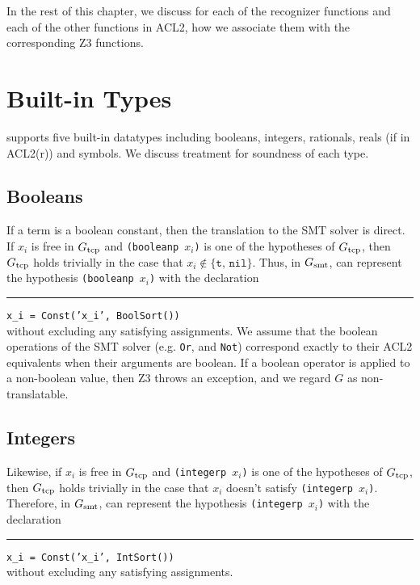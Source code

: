 In the rest of this chapter, we discuss for each of the recognizer functions and
each of the other functions in ACL2, how we associate them with the
corresponding Z3 functions.

\section{Built-in Types}\label{sec:soundbuiltin}
\smtlink{} supports five built-in datatypes including booleans, integers,
rationals, reals (if in ACL2(r)) and symbols. We discuss treatment for soundness
of each type. 

\subsection{Booleans}\label{subsec:bools}
If a term is a boolean constant, then the translation to the \acs{SMT} solver is
direct.
If $x_i$ is free in $G_{\mathrm{tcp}}$ and \texttt{(booleanp $x_i$)} is one of the
hypotheses of $G_{\mathrm{tcp}}$, then $G_{\mathrm{tcp}}$ holds trivially in the case that $x_i
\not\in \{\texttt{t},\,\texttt{nil}\}$.  Thus, in $G_{\mathrm{smt}}$, \smtlink{} can
represent the hypothesis \texttt{(booleanp $x_i$)} with the declaration\\
\rule{2em}{0ex}\texttt{x\_i = Const('x\_i', BoolSort())}\\
without excluding any satisfying assignments.
We assume that the boolean operations of the \acs{SMT} solver (e.g. \texttt{Or},
and \texttt{Not}) correspond exactly to their ACL2 equivalents when their
arguments are boolean.
If a boolean operator is applied to a non-boolean value, then Z3 throws an
exception, and we regard $G$ as non-translatable.

\subsection{Integers}\label{subsec:ints}
Likewise, if $x_i$ is free in $G_{\mathrm{tcp}}$ and \texttt{(integerp $x_i$)} is one of
the hypotheses of $G_{\mathrm{tcp}}$, then $G_{\mathrm{tcp}}$ holds trivially in the case that $x_i$
doesn't satisfy \texttt{(integerp $x_i$)}. Therefore, in $G_{\mathrm{smt}}$, \smtlink{} can
represent the hypothesis \texttt{(integerp $x_i$)} with the declaration\\
\rule{2em}{0ex}\texttt{x\_i = Const('x\_i', IntSort())}\\
without excluding any satisfying assignments.

